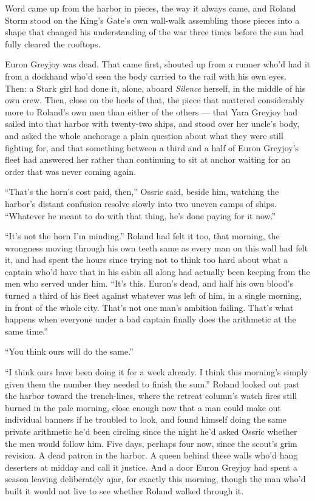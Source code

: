 Word came up from the harbor in pieces, the way it always came, and Roland Storm stood on the King’s Gate’s own wall-walk assembling those pieces into a shape that changed his understanding of the war three times before the sun had fully cleared the rooftops.

Euron Greyjoy was dead. That came first, shouted up from a runner who’d had it from a dockhand who’d seen the body carried to the rail with his own eyes. Then: a Stark girl had done it, alone, aboard \textit{Silence} herself, in the middle of his own crew. Then, close on the heels of that, the piece that mattered considerably more to Roland’s own men than either of the others — that Yara Greyjoy had sailed into that harbor with twenty-two ships, and stood over her uncle’s body, and asked the whole anchorage a plain question about what they were still fighting for, and that something between a third and a half of Euron Greyjoy’s fleet had answered her rather than continuing to sit at anchor waiting for an order that was never coming again.

“That’s the horn’s cost paid, then,” Ossric said, beside him, watching the harbor’s distant confusion resolve slowly into two uneven camps of ships. “Whatever he meant to do with that thing, he’s done paying for it now.”

“It’s not the horn I’m minding.” Roland had felt it too, that morning, the wrongness moving through his own teeth same as every man on this wall had felt it, and had spent the hours since trying not to think too hard about what a captain who’d have that in his cabin all along had actually been keeping from the men who served under him. “It’s this. Euron’s dead, and half his own blood’s turned a third of his fleet against whatever was left of him, in a single morning, in front of the whole city. That’s not one man’s ambition failing. That’s what happens when everyone under a bad captain finally does the arithmetic at the same time.”

“You think ours will do the same.”

“I think ours have been doing it for a week already. I think this morning’s simply given them the number they needed to finish the sum.” Roland looked out past the harbor toward the trench-lines, where the retreat column’s watch fires still burned in the pale morning, close enough now that a man could make out individual banners if he troubled to look, and found himself doing the same private arithmetic he’d been circling since the night he’d asked Ossric whether the men would follow him. Five days, perhaps four now, since the scout’s grim revision. A dead patron in the harbor. A queen behind these walls who’d hang deserters at midday and call it justice. And a door Euron Greyjoy had spent a season leaving deliberately ajar, for exactly this morning, though the man who’d built it would not live to see whether Roland walked through it.

